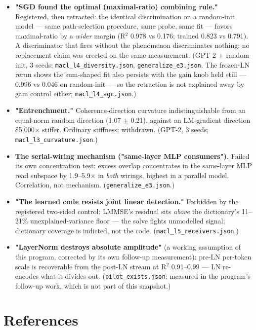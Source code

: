 \documentclass[10pt]{article}
\begin{document}
\begin{itemize}\setlength\itemsep{1pt}
\item \textbf{"SGD found the optimal (maximal-ratio) combining rule."} Registered, then retracted: the identical discrimination on a random-init model --- same path-selection procedure, same probe, same fit --- favors maximal-ratio by a \emph{wider} margin (R$^{2}$ 0.978 vs 0.176; trained 0.823 vs 0.791). A discriminator that fires without the phenomenon discriminates nothing; no replacement claim was erected on the same measurement. (GPT-2 + random-init, 3 seeds; \texttt{macl\_l4\_diversity.json}, \texttt{generalize\_e3.json}. The frozen-LN rerun shows the sum-shaped fit also persists with the gain knob held still --- 0.996 vs 0.046 on random-init --- so the retraction is not explained away by gain control either; \texttt{macl\_l4\_agc.json}.)
\item \textbf{"Entrenchment."} Coherence-direction curvature indistinguishable from an equal-norm random direction (1.07 $\pm$ 0.21), against an LM-gradient direction 85,000$\times$ stiffer. Ordinary stiffness; withdrawn. (GPT-2, 3 seeds; \texttt{macl\_l3\_curvature.json}.)
\item \textbf{The serial-wiring mechanism ("same-layer MLP consumers").} Failed its own concentration test: excess overlap concentrates in the same-layer MLP read subspace by 1.9--5.9$\times$ in \emph{both} wirings, highest in a parallel model. Correlation, not mechanism. (\texttt{generalize\_e3.json}.)
\item \textbf{"The learned code resists joint linear detection."} Forbidden by the registered two-sided control: LMMSE's residual sits \emph{above} the dictionary's 11--21\% unexplained-variance floor --- the solve fights unmodelled signal; dictionary coverage is indicted, not the code. (\texttt{macl\_l5\_receivers.json}.)
\item \textbf{"LayerNorm destroys absolute amplitude"} (a working assumption of this program, corrected by its own follow-up measurement): pre-LN per-token scale is recoverable from the post-LN stream at R$^{2}$ 0.91--0.99 --- LN re-encodes what it divides out. (\texttt{pilot\_exists.json}; measured in the program's follow-up work, which is not part of this snapshot.)
\end{itemize}
\section{References}
\end{document}

